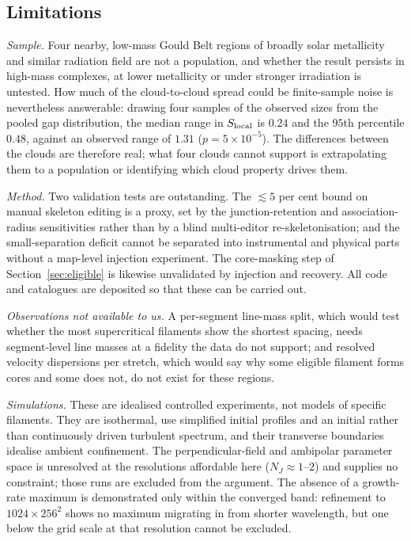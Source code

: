 \documentclass[usenatbib,twoside,twocolumn]{mnras}
\begin{document}
\subsection{Limitations}
\label{sec:limitations}

\emph{Sample.} Four nearby, low-mass Gould Belt regions of broadly solar metallicity and similar radiation field are not a population, and whether the result persists in high-mass complexes, at lower metallicity or under stronger irradiation is untested. How much of the cloud-to-cloud spread could be finite-sample noise is nevertheless answerable: drawing four samples of the observed sizes from the pooled gap distribution, the median range in $S_{\rm local}$ is $0.24$ and the $95$th percentile $0.48$, against an observed range of $1.31$ ($p=5\times10^{-5}$). The differences between the clouds are therefore real; what four clouds cannot support is extrapolating them to a population or identifying which cloud property drives them.

\emph{Method.} Two validation tests are outstanding. The $\lesssim5$ per cent bound on manual skeleton editing is a proxy, set by the junction-retention and association-radius sensitivities rather than by a blind multi-editor re-skeletonisation; and the small-separation deficit cannot be separated into instrumental and physical parts without a map-level injection experiment. The core-masking step of Section~\ref{sec:eligible} is likewise unvalidated by injection and recovery. All code and catalogues are deposited so that these can be carried out.

\emph{Observations not available to us.} A per-segment line-mass split, which would test whether the most supercritical filaments show the shortest spacing, needs segment-level line masses at a fidelity the data do not support; and resolved velocity dispersions per stretch, which would say why some eligible filament forms cores and some does not, do not exist for these regions.

\emph{Simulations.} These are idealised controlled experiments, not models of specific filaments. They are isothermal, use simplified initial profiles and an initial rather than continuously driven turbulent spectrum, and their transverse boundaries idealise ambient confinement. The perpendicular-field and ambipolar parameter space is unresolved at the resolutions affordable here ($N_J\approx1$--$2$) and supplies no constraint; those runs are excluded from the argument. The absence of a growth-rate maximum is demonstrated only within the converged band: refinement to $1024\times256^2$ shows no maximum migrating in from shorter wavelength, but one below the grid scale at that resolution cannot be excluded.
\end{document}
